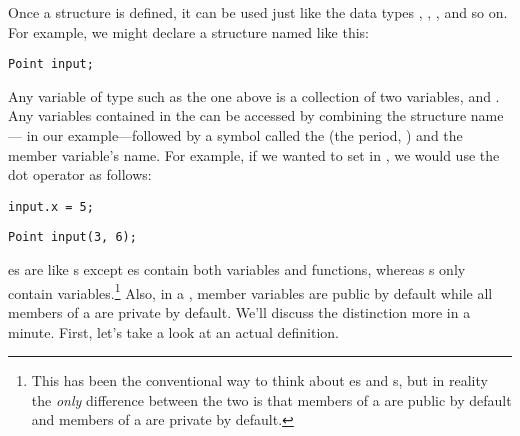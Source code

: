 Once a structure is defined, it can be used just like the data types , , , and so on. 
For example, we might declare a  structure named  like this:

\noindent\begin{minipage}{\linewidth}\begin{lstlisting}
Point input;
\end{lstlisting}\end{minipage}


Any variable of type  such as the one above is a collection of two variables,  and . 
Any variables contained in the  can be accessed by combining the structure name--- in our example---followed by a symbol called the  (the period, ) and the member variable's name. 
For example, if we wanted to set  in , we would use the dot operator as follows:

\noindent\begin{minipage}{\linewidth}\begin{lstlisting}
input.x = 5;
\end{lstlisting}\end{minipage}



\noindent\begin{minipage}{\linewidth}\begin{lstlisting}
Point input(3, 6); 
\end{lstlisting}\end{minipage}


es are like s except es contain both variables and functions, whereas s only contain variables.\footnote{This has been the conventional way to think about es and s, but in reality the \emph{only} difference between the two is that members of a  are public by default and members of a  are private by default.} 
Also, in a , member variables are public by default while all members of a  are private by default. 
We'll discuss the distinction more in a minute. 
First, let's take a look at an actual  definition.

